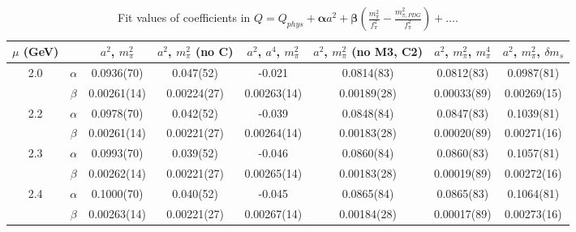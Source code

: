 \documentclass[12pt]{extarticle}
\begin{document}
\begin{table}[h!]
\begin{center}
\begin{tabular}{|c c|c|c|c|c|c|c|}
\hline
$\mu$ (GeV) &  & $a^2$, $m_\pi^2$& $a^2$, $m_\pi^2$ (no C)& $a^2$, $a^4$, $m_\pi^2$& $a^2$, $m_\pi^2$ (no M3, C2)& $a^2$, $m_\pi^2$, $m_\pi^4$& $a^2$, $m_\pi^2$, $\delta m_s$\\
\hline
\multirow{2}{0.5in}{2.0} & $\alpha$ & 0.0936(70)& 0.047(52)& -0.021& 0.0814(83)& 0.0812(83)& 0.0987(81)\\
 & $\beta$ & 0.00261(14)& 0.00224(27)& 0.00263(14)& 0.00189(28)& 0.00033(89)& 0.00269(15)\\
\hline
\multirow{2}{0.5in}{2.2} & $\alpha$ & 0.0978(70)& 0.042(52)& -0.039& 0.0848(84)& 0.0847(83)& 0.1039(81)\\
 & $\beta$ & 0.00261(14)& 0.00221(27)& 0.00264(14)& 0.00183(28)& 0.00020(89)& 0.00271(16)\\
\hline
\multirow{2}{0.5in}{2.3} & $\alpha$ & 0.0993(70)& 0.039(52)& -0.046& 0.0860(84)& 0.0860(83)& 0.1057(81)\\
 & $\beta$ & 0.00262(14)& 0.00221(27)& 0.00265(14)& 0.00183(28)& 0.00019(89)& 0.00272(16)\\
\hline
\multirow{2}{0.5in}{2.4} & $\alpha$ & 0.1000(70)& 0.040(52)& -0.045& 0.0865(84)& 0.0865(83)& 0.1064(81)\\
 & $\beta$ & 0.00263(14)& 0.00221(27)& 0.00267(14)& 0.00184(28)& 0.00017(89)& 0.00273(16)\\
\hline
\end{tabular}
\caption{Fit values of coefficients in $Q = Q_{phys} + \mathbf{\alpha} a^2 + \mathbf{\beta}\left(\frac{m_\pi^2}{f_\pi^2}-\frac{m_{\pi,PDG}^2}{f_\pi^2}\right) + \ldots$.}
\end{center}
\end{table}
























\clearpage
\end{document}
